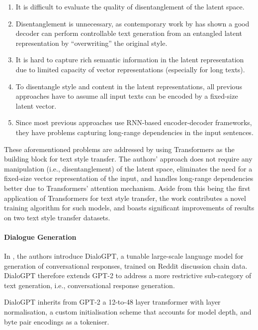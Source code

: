 \begin{enumerate}
    \item It is difficult to evaluate the quality of disentanglement of the latent space.
    \item Disentanglement is unnecessary, as contemporary work by \cite{lample2018multipleattribute} has shown a good decoder can perform controllable text generation from an entangled latent representation by ``overwriting'' the original style.
    \item It is hard to capture rich semantic information in the latent representation due to limited capacity of vector representations (especially for long texts).
    \item To disentangle style and content in the latent representations, all previous approaches have to assume all input texts can be encoded by a fixed-size latent vector.
    \item Since most previous approaches use RNN-based encoder-decoder frameworks, they have problems capturing long-range dependencies in the input sentences.
\end{enumerate}

These aforementioned problems are addressed by \cite{dai2019style} using Transformers \citep{vaswani2017attention} as the building block for text style transfer. The authors' approach does not require any manipulation (i.e., disentanglement) of the latent space, eliminates the need for a fixed-size vector representation of the input, and handles long-range dependencies better due to Transformers' attention mechanism. Aside from this being the first application of Transformers for text style transfer, the work contributes a novel training algorithm for such models, and boasts significant improvements of results on two text style transfer datasets.

\paragraph{Dialogue Generation}
In \cite{zhang2019dialogpt}, the authors introduce DialoGPT, a tunable large-scale language model for generation of conversational responses, trained on Reddit discussion chain data. DialoGPT therefore extends GPT-2 \cite{radford2019language} to address a more restrictive sub-category of text generation, i.e., conversational response generation.  

DialoGPT inherits from GPT-2 a 12-to-48 layer transformer with layer normalisation, a custom initialisation scheme that accounts for model depth, and byte pair encodings \cite{sennrich-etal-2016-neural} as a tokeniser.

